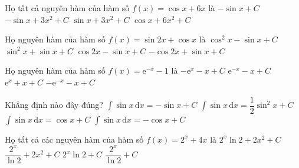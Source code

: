 \begin{ex}%
	Họ tất cả nguyên hàm của hàm số $ f(x)=\cos x+6x$ là
	\choice
	{$-\sin x+C$}
	{$-\sin x+3x^2+C$}
	{\True $\sin x+3x^2+C$}
	{$\cos x+6x^2+C$}
\end{ex}

\begin{ex}%
	Họ nguyên hàm của hàm số $ f(x)=\sin 2x+\cos x$ là
	\choice
	{$\cos^2x-\sin x+C$}
	{\True $\sin^2x+\sin x+C$}
	{$\cos 2x-\sin x+C$}
	{$-\cos 2x+\sin x+C$}
\end{ex}

\begin{ex}%
	Họ nguyên hàm của hàm số $f(x)=\mathrm{e}^{-x}-1$ là
	\choice
	{$-\mathrm{e}^x-x+C$}
	{$\mathrm{e}^{-x}-x+C$}
	{$\mathrm{e}^x+x+C$}
	{\True $-\mathrm{e}^{-x}-x+C$}
\end{ex}

\begin{ex}%
	Khẳng định nào đây đúng?
	\choice
	{$\displaystyle\int\sin x\mathrm{\,d}x=-\sin x+C$}
	{$\displaystyle\int\sin x\mathrm{\,d}x=\dfrac{1}{2}\sin^2x+C$}
	{$\displaystyle\int\sin x\mathrm{\,d}x=\cos x+C$}
	{\True $\displaystyle\int\sin x\mathrm{\,d}x=-\cos x+C$}
\end{ex}

\begin{ex}%
	Họ tất cả các nguyên hàm của hàm số $ f(x)=2^x+4x$ là
	\choice
	{$2^x\ln 2+2x^2+C$}
	{\True $\dfrac{2^x}{\ln 2}+2x^2+C$}
	{$2^x\ln 2+C$}
	{$\dfrac{2^x}{\ln 2}+C$}
\end{ex}

